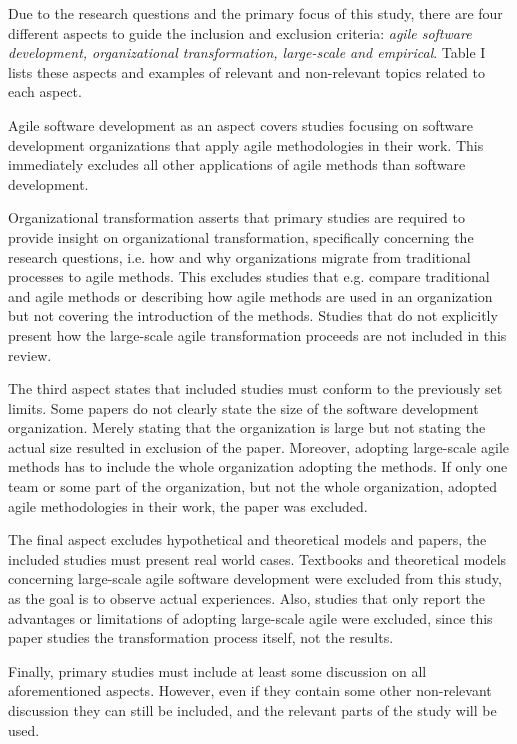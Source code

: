 
Due to the research questions and the primary focus of this study, there are
four different aspects to guide the inclusion and exclusion criteria:
\textit{agile software development, organizational transformation, large-scale
and empirical}. Table I lists these aspects and examples of relevant and
non-relevant topics related to each aspect.


\vspace{1.5cm}

Agile software development as an aspect covers studies focusing on
software development organizations that apply agile methodologies in
their work. This immediately excludes all other applications of agile
methods than software development.

Organizational transformation asserts that primary studies are required
to provide insight on organizational transformation, specifically
concerning the research questions, i.e. how and why organizations
migrate from traditional processes to agile methods. This excludes
studies that e.g. compare traditional and agile methods or describing
how agile methods are used in an organization but not covering the
introduction of the methods. Studies that do not explicitly present how
the large-scale agile transformation proceeds are not included in this
review.

The third aspect states that included studies must conform to the
previously set limits. Some papers do not clearly state the size of the
software development organization. Merely stating that the organization
is large but not stating the actual size resulted in exclusion of the
paper. Moreover, adopting large-scale agile methods has to include the
whole organization adopting the methods. If only one team or some part
of the organization, but not the whole organization, adopted agile
methodologies in their work, the paper was excluded.

The final aspect excludes hypothetical and theoretical models
and papers, the included studies must present real world cases.
Textbooks and theoretical models concerning large-scale agile software
development were excluded from this study, as the goal is to observe
actual experiences. Also, studies that only report the advantages or
limitations of adopting large-scale agile were excluded, since this
paper studies the transformation process itself, not the results.

Finally, primary studies must include at least some discussion on
all aforementioned aspects. However, even if they contain some other
non-relevant discussion they can still be included, and the relevant
parts of the study will be used.
